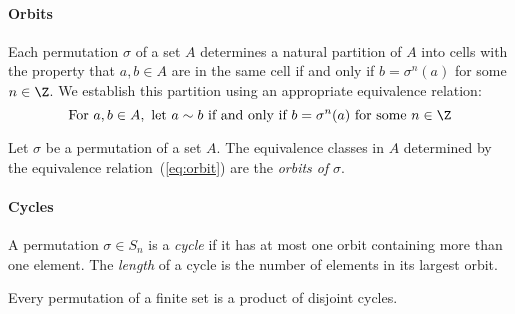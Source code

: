 \paragraph{Orbits}
Each permutation $\sigma$ of a set $A$ determines a natural partition
of $A$ into cells with the property that $a,b \in A$ are in the same
cell if and only if $b = \sigma^n(a)$ for some $n\in \Z$.  We
establish this partition using an appropriate equivalence relation:
\begin{equation}
\label{eq:orbit}
\text{For } a,b \in A, \text{ let } a \sim b 
\text{ if and only if }
b = \sigma^n(a) \text{ for some } n\in \Z
\end{equation}
\begin{definition}
Let $\sigma$ be a permutation of a set $A$.  The equivalence classes
in $A$ determined by the equivalence relation~(\ref{eq:orbit}) are the
\emph{orbits of} $\sigma$.
\end{definition}
\paragraph{Cycles}
\begin{definition}[Cycle]
A permutation $\sigma \in S_n$ is a \emph{cycle} if it has at most one
orbit containing more than one element.  The \emph{length} of a cycle
is the number of elements in its largest orbit.
\end{definition}

\begin{theorem}
\label{thm:permCycle}
Every permutation of a finite set is a product of disjoint cycles.
\end{theorem}
%
